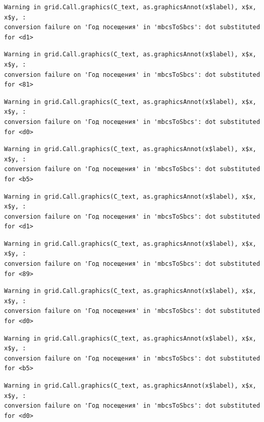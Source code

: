\documentclass[
  letterpaper,
  DIV=11,
  numbers=noendperiod]{scrartcl}
\begin{document}
\begin{verbatim}
Warning in grid.Call.graphics(C_text, as.graphicsAnnot(x$label), x$x, x$y, :
conversion failure on 'Год посещения' in 'mbcsToSbcs': dot substituted for <d1>
\end{verbatim}

\begin{verbatim}
Warning in grid.Call.graphics(C_text, as.graphicsAnnot(x$label), x$x, x$y, :
conversion failure on 'Год посещения' in 'mbcsToSbcs': dot substituted for <81>
\end{verbatim}

\begin{verbatim}
Warning in grid.Call.graphics(C_text, as.graphicsAnnot(x$label), x$x, x$y, :
conversion failure on 'Год посещения' in 'mbcsToSbcs': dot substituted for <d0>
\end{verbatim}

\begin{verbatim}
Warning in grid.Call.graphics(C_text, as.graphicsAnnot(x$label), x$x, x$y, :
conversion failure on 'Год посещения' in 'mbcsToSbcs': dot substituted for <b5>
\end{verbatim}

\begin{verbatim}
Warning in grid.Call.graphics(C_text, as.graphicsAnnot(x$label), x$x, x$y, :
conversion failure on 'Год посещения' in 'mbcsToSbcs': dot substituted for <d1>
\end{verbatim}

\begin{verbatim}
Warning in grid.Call.graphics(C_text, as.graphicsAnnot(x$label), x$x, x$y, :
conversion failure on 'Год посещения' in 'mbcsToSbcs': dot substituted for <89>
\end{verbatim}

\begin{verbatim}
Warning in grid.Call.graphics(C_text, as.graphicsAnnot(x$label), x$x, x$y, :
conversion failure on 'Год посещения' in 'mbcsToSbcs': dot substituted for <d0>
\end{verbatim}

\begin{verbatim}
Warning in grid.Call.graphics(C_text, as.graphicsAnnot(x$label), x$x, x$y, :
conversion failure on 'Год посещения' in 'mbcsToSbcs': dot substituted for <b5>
\end{verbatim}

\begin{verbatim}
Warning in grid.Call.graphics(C_text, as.graphicsAnnot(x$label), x$x, x$y, :
conversion failure on 'Год посещения' in 'mbcsToSbcs': dot substituted for <d0>
\end{verbatim}
\end{document}

